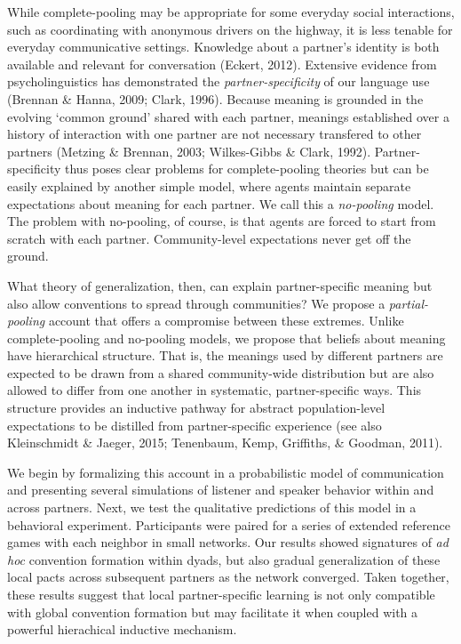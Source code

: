 \documentclass[10pt, letterpaper]{article}
\begin{document}
While complete-pooling may be appropriate for some everyday social
interactions, such as coordinating with anonymous drivers on the
highway, it is less tenable for everyday communicative settings.
Knowledge about a partner's identity is both available and relevant for
conversation (Eckert, 2012). Extensive evidence from psycholinguistics
has demonstrated the \emph{partner-specificity} of our language use
(Brennan \& Hanna, 2009; Clark, 1996). Because meaning is grounded in
the evolving `common ground' shared with each partner, meanings
established over a history of interaction with one partner are not
necessary transfered to other partners (Metzing \& Brennan, 2003;
Wilkes-Gibbs \& Clark, 1992). Partner-specificity thus poses clear
problems for complete-pooling theories but can be easily explained by
another simple model, where agents maintain separate expectations about
meaning for each partner. We call this a \emph{no-pooling} model. The
problem with no-pooling, of course, is that agents are forced to start
from scratch with each partner. Community-level expectations never get
off the ground.

What theory of generalization, then, can explain partner-specific
meaning but also allow conventions to spread through communities? We
propose a \emph{partial-pooling} account that offers a compromise
between these extremes. Unlike complete-pooling and no-pooling models,
we propose that beliefs about meaning have hierarchical structure. That
is, the meanings used by different partners are expected to be drawn
from a shared community-wide distribution but are also allowed to differ
from one another in systematic, partner-specific ways. This structure
provides an inductive pathway for abstract population-level expectations
to be distilled from partner-specific experience (see also Kleinschmidt
\& Jaeger, 2015; Tenenbaum, Kemp, Griffiths, \& Goodman, 2011).

We begin by formalizing this account in a probabilistic model of
communication and presenting several simulations of listener and speaker
behavior within and across partners. Next, we test the qualitative
predictions of this model in a behavioral experiment. Participants were
paired for a series of extended reference games with each neighbor in
small networks. Our results showed signatures of \emph{ad hoc}
convention formation within dyads, but also gradual generalization of
these local pacts across subsequent partners as the network converged.
Taken together, these results suggest that local partner-specific
learning is not only compatible with global convention formation but may
facilitate it when coupled with a powerful hierachical inductive
mechanism.
\end{document}
